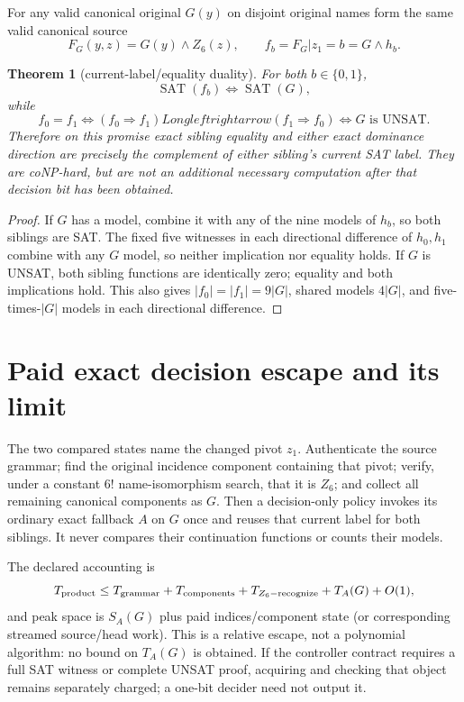 \documentclass[11pt]{article}
\newtheorem{theorem}{Theorem}
\begin{document}
For any valid canonical original $G(y)$ on disjoint original names form the same valid canonical source
\[
F_G(y,z)=G(y)\land Z_6(z),\qquad f_b=F_G|z_1=b=G\land h_b.
\]

\begin{theorem}[current-label/equality duality]
For both $b\in\{0,1\}$,
\[
\operatorname{SAT}(f_b)\Longleftrightarrow\operatorname{SAT}(G),
\]
while
\[
f_0=f_1\Longleftrightarrow(f_0\Rightarrow f_1)Longleftrightarrow
(f_1\Rightarrow f_0)\Longleftrightarrow G\text{ is UNSAT}.
\]
Therefore on this promise exact sibling equality and either exact dominance direction are precisely the complement of either sibling's current SAT label. They are coNP-hard, but are not an additional necessary computation after that decision bit has been obtained.
\end{theorem}
\begin{proof}
If $G$ has a model, combine it with any of the nine models of $h_b$, so both siblings are SAT. The fixed five witnesses in each directional difference of $h_0,h_1$ combine with any $G$ model, so neither implication nor equality holds. If $G$ is UNSAT, both sibling functions are identically zero; equality and both implications hold. This also gives $|f_0|=|f_1|=9|G|$, shared models $4|G|$, and five-times-$|G|$ models in each directional difference.
\end{proof}

\section{Paid exact decision escape and its limit}
The two compared states name the changed pivot $z_1$. Authenticate the source grammar; find the original incidence component containing that pivot; verify, under a constant $6!$ name-isomorphism search, that it is $Z_6$; and collect all remaining canonical components as $G$. Then a decision-only policy invokes its ordinary exact fallback $A$ on $G$ once and reuses that current label for both siblings. It never compares their continuation functions or counts their models.

The declared accounting is
\[
T_{\rm product}\le T_{\rm grammar}+T_{\rm components}+T_{Z_6\rm-recognize}+T_A(G)+O(1),
\]
and peak space is $S_A(G)$ plus paid indices/component state (or corresponding streamed source/head work). This is a relative escape, not a polynomial algorithm: no bound on $T_A(G)$ is obtained. If the controller contract requires a full SAT witness or complete UNSAT proof, acquiring and checking that object remains separately charged; a one-bit decider need not output it.
\end{document}
